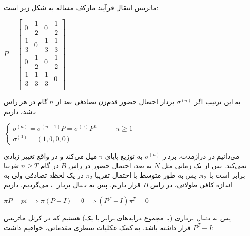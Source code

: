 \documentclass{scribe-cgenomics}
\begin{document}
\begin{حل}

ماتریس انتقال فرآیند مارکف مساله به شکل زیر است:

\begin{center}
$
P = 
\begin{bmatrix}
0 & \dfrac{1}{2} & 0& \dfrac{1}{2}\\
\dfrac{1}{3} & 0 & \dfrac{1}{3} & \dfrac{1}{3}\\
0& \dfrac{1}{2} & 0 & \dfrac{1}{2}\\
\dfrac{1}{3} & \dfrac{1}{3} & \dfrac{1}{3} & 0\\
\end{bmatrix}
$
\end{center}

به این ترتیب اگر
$\sigma^{(n)}$
بردار احتمال حضور قدم‌زن تصادفی بعد از
$n$
گام در هر راس باشد، داریم

\begin{center}
$
\begin{cases}
\sigma^{(n)} = \sigma^{(n-1)}P = \sigma^{(0)}P^n & \qquad n \geq 1\\
\sigma^{(0)} = (1, 0, 0, 0)
\end{cases}
$
\end{center}

می‌دانیم در درازمدت، بردار
$\sigma^{(n)}$
به توزیع پایای
$\pi$
میل می‌کند و در واقع تغییر زیادی نمی‌کند. پس از یک زمانی مثل
$N$
به بعد، احتمال حضور در راس
$B$
در گام
$n\geq T$
تقریبا برابر است با
$\pi_2$.
پس به طور متوسط با احتمال تقریبا
$\pi_2$
در یک لحظه تصادفی ولی به اندازه کافی طولانی، در راس
$B$
قرار داریم. پس به دنبال بردار
$\pi$
می‌گردیم.
داریم:

\begin{center}
$
\pi P = pi
\implies \pi (P-I) = 0
\implies (P^T-I)\pi^T = 0
$
\end{center}

پس به دنبال برداری (با مجموع درایه‌های برابر با یک) هستیم که در کرنل ماتریس
$P^T-I$
قرار داشته باشد. به کمک عکلیات سطری مقدماتی، خواهیم داشت:


\end{حل}
\end{document}
